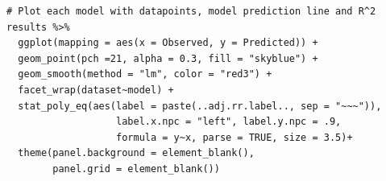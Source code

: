 \documentclass[
]{article}
\begin{document}
\begin{verbatim}
# Plot each model with datapoints, model prediction line and R^2
results %>% 
  ggplot(mapping = aes(x = Observed, y = Predicted)) +
  geom_point(pch =21, alpha = 0.3, fill = "skyblue") +
  geom_smooth(method = "lm", color = "red3") +
  facet_wrap(dataset~model) +
  stat_poly_eq(aes(label = paste(..adj.rr.label.., sep = "~~~")), 
                   label.x.npc = "left", label.y.npc = .9,
                   formula = y~x, parse = TRUE, size = 3.5)+
  theme(panel.background = element_blank(),
        panel.grid = element_blank())
\end{verbatim}
\end{document}

